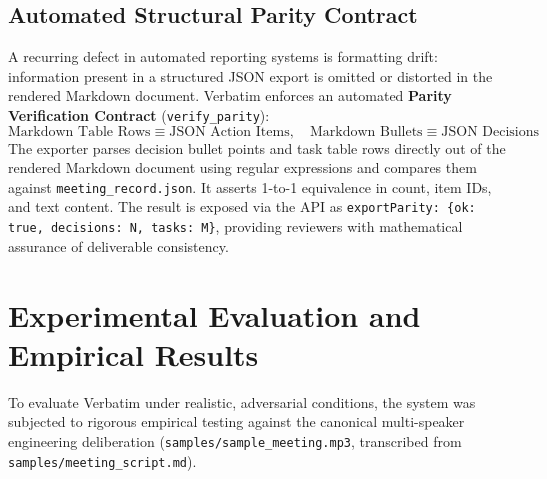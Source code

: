 \documentclass[10pt,a4paper]{article}
\begin{document}
\subsection{Automated Structural Parity Contract}
A recurring defect in automated reporting systems is formatting drift: information present in a structured JSON export is omitted or distorted in the rendered Markdown document. Verbatim enforces an automated \textbf{Parity Verification Contract} (\texttt{verify\_parity}):
\begin{equation}
\text{Markdown Table Rows} \equiv \text{JSON Action Items}, \quad \text{Markdown Bullets} \equiv \text{JSON Decisions}
\end{equation}
The exporter parses decision bullet points and task table rows directly out of the rendered Markdown document using regular expressions and compares them against \texttt{meeting\_record.json}. It asserts 1-to-1 equivalence in count, item IDs, and text content. The result is exposed via the API as \texttt{exportParity: \{ok: true, decisions: N, tasks: M\}}, providing reviewers with mathematical assurance of deliverable consistency.

\section{Experimental Evaluation and Empirical Results}
\label{sec:evaluation}

To evaluate Verbatim under realistic, adversarial conditions, the system was subjected to rigorous empirical testing against the canonical multi-speaker engineering deliberation (\texttt{samples/sample\_meeting.mp3}, transcribed from \texttt{samples/meeting\_script.md}). 
\end{document}
